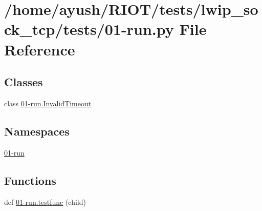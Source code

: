 \hypertarget{lwip__sock__tcp_2tests_201-run_8py}{}\section{/home/ayush/\+R\+I\+O\+T/tests/lwip\+\_\+sock\+\_\+tcp/tests/01-\/run.py File Reference}
\label{lwip__sock__tcp_2tests_201-run_8py}
\subsection*{Classes}
\begin{DoxyCompactItemize}
\item 
class \hyperlink{class01-run_1_1InvalidTimeout}{01-\/run.\+Invalid\+Timeout}
\end{DoxyCompactItemize}
\subsection*{Namespaces}
\begin{DoxyCompactItemize}
\item 
 \hyperlink{namespace01-run}{01-\/run}
\end{DoxyCompactItemize}
\subsection*{Functions}
\begin{DoxyCompactItemize}
\item 
def \hyperlink{namespace01-run_aff983ffd4ab0e6bf8e7e58970e4a10bb}{01-\/run.\+testfunc} (child)
\end{DoxyCompactItemize}
